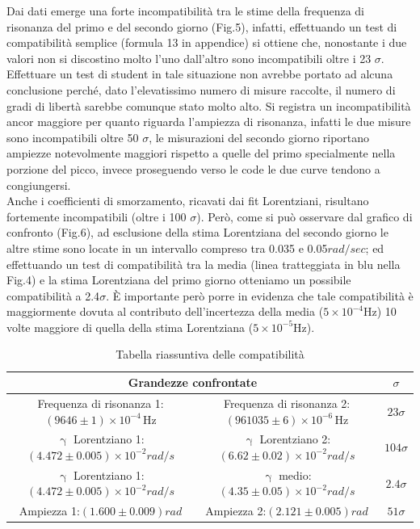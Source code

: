 \documentclass{article}
\begin{document}
Dai dati emerge una forte incompatibilità tra le stime della frequenza di risonanza del primo e del secondo giorno (Fig.5), infatti, effettuando un test di compatibilità semplice (formula 13 in appendice) si ottiene che, nonostante i due valori non si discostino molto l'uno dall'altro sono incompatibili oltre i 23 $\sigma$. Effettuare un test di student in tale situazione non avrebbe portato ad alcuna conclusione perché, dato l'elevatissimo numero di misure raccolte, il numero di gradi di libertà sarebbe comunque stato molto alto. Si registra un incompatibilità ancor maggiore per quanto riguarda l'ampiezza di risonanza, infatti le due misure sono incompatibili oltre 50 $\sigma$, le misurazioni del secondo giorno riportano ampiezze notevolmente maggiori rispetto a quelle del primo specialmente nella porzione del picco, invece proseguendo verso le code le due curve tendono a congiungersi.\\Anche i coefficienti di smorzamento, ricavati dai fit Lorentziani, risultano fortemente incompatibili (oltre i 100 $\sigma$). Però, come si può osservare dal grafico di confronto (Fig.6), ad esclusione della stima Lorentziana del secondo giorno le altre stime sono locate in un intervallo compreso tra 0.035 e 0.05$rad/sec$; ed effettuando un test di compatibilità tra la media (linea tratteggiata in blu nella Fig.4) e la stima Lorentziana del primo giorno otteniamo un possibile compatibilità a 2.4$\sigma$. È importante però porre in evidenza che tale compatibilità è maggiormente dovuta al contributo dell'incertezza della media ($5\times10^{-4}$Hz) 10 volte maggiore di quella della stima Lorentziana ($5\times10^{-5}$Hz).
\begin{table}[H]
    \centering
    \begin{tabular}{|c|c|c|}
        \hline
        \multicolumn{2}{|c|}{Grandezze confrontate} & $\sigma$ \\ \hline 
        Frequenza di risonanza 1: $(9646 \pm 1) \times 10^{-4}\,\text{Hz}$ & Frequenza di risonanza 2: $(961035 \pm 6) \times 10^{-6}\,\text{Hz}$ & $23\sigma$\\ \hline 
        $\upgamma$ Lorentziano 1: $(4.472 \pm 0.005) \times 10^{-2}rad/s$ & $\upgamma$ Lorentziano 2: $(6.62 \pm 0.02) \times 10^{-2}rad/s$ & $104\sigma$ \\ \hline 
        $\upgamma$ Lorentziano 1: $(4.472 \pm 0.005) \times 10^{-2}rad/s$ & $\upgamma$ medio: $(4.35 \pm 0.05) \times 10^{-2}rad/s$ & $2.4\sigma$ \\ \hline 
        Ampiezza 1:$(1.600 \pm 0.009)rad$  & Ampiezza 2:$(2.121 \pm 0.005)rad$  & $51\sigma$ \\ \hline 
    \end{tabular}
    \caption{Tabella riassuntiva delle compatibilità}
    \label{tab:my_label} 
\end{table}
\end{document}
